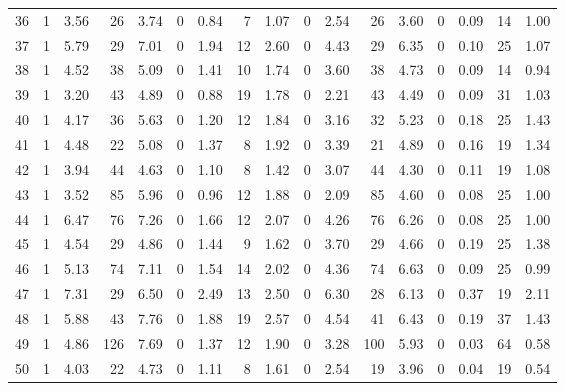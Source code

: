 \begin{table}
\begin{tabular}{lrrrrrrrrrrrrrrrr}
36 & 1 & 3.56 & 26 & 3.74 & 0 & 0.84 & 7 & 1.07 & 0 & 2.54 & 26 & 3.60 & 0 & 0.09 & 14 & 1.00 \\
37 & 1 & 5.79 & 29 & 7.01 & 0 & 1.94 & 12 & 2.60 & 0 & 4.43 & 29 & 6.35 & 0 & 0.10 & 25 & 1.07 \\
38 & 1 & 4.52 & 38 & 5.09 & 0 & 1.41 & 10 & 1.74 & 0 & 3.60 & 38 & 4.73 & 0 & 0.09 & 14 & 0.94 \\
39 & 1 & 3.20 & 43 & 4.89 & 0 & 0.88 & 19 & 1.78 & 0 & 2.21 & 43 & 4.49 & 0 & 0.09 & 31 & 1.03 \\
40 & 1 & 4.17 & 36 & 5.63 & 0 & 1.20 & 12 & 1.84 & 0 & 3.16 & 32 & 5.23 & 0 & 0.18 & 25 & 1.43 \\
41 & 1 & 4.48 & 22 & 5.08 & 0 & 1.37 & 8 & 1.92 & 0 & 3.39 & 21 & 4.89 & 0 & 0.16 & 19 & 1.34 \\
42 & 1 & 3.94 & 44 & 4.63 & 0 & 1.10 & 8 & 1.42 & 0 & 3.07 & 44 & 4.30 & 0 & 0.11 & 19 & 1.08 \\
43 & 1 & 3.52 & 85 & 5.96 & 0 & 0.96 & 12 & 1.88 & 0 & 2.09 & 85 & 4.60 & 0 & 0.08 & 25 & 1.00 \\
44 & 1 & 6.47 & 76 & 7.26 & 0 & 1.66 & 12 & 2.07 & 0 & 4.26 & 76 & 6.26 & 0 & 0.08 & 25 & 1.00 \\
45 & 1 & 4.54 & 29 & 4.86 & 0 & 1.44 & 9 & 1.62 & 0 & 3.70 & 29 & 4.66 & 0 & 0.19 & 25 & 1.38 \\
46 & 1 & 5.13 & 74 & 7.11 & 0 & 1.54 & 14 & 2.02 & 0 & 4.36 & 74 & 6.63 & 0 & 0.09 & 25 & 0.99 \\
47 & 1 & 7.31 & 29 & 6.50 & 0 & 2.49 & 13 & 2.50 & 0 & 6.30 & 28 & 6.13 & 0 & 0.37 & 19 & 2.11 \\
48 & 1 & 5.88 & 43 & 7.76 & 0 & 1.88 & 19 & 2.57 & 0 & 4.54 & 41 & 6.43 & 0 & 0.19 & 37 & 1.43 \\
49 & 1 & 4.86 & 126 & 7.69 & 0 & 1.37 & 12 & 1.90 & 0 & 3.28 & 100 & 5.93 & 0 & 0.03 & 64 & 0.58 \\
50 & 1 & 4.03 & 22 & 4.73 & 0 & 1.11 & 8 & 1.61 & 0 & 2.54 & 19 & 3.96 & 0 & 0.04 & 19 & 0.54 \\
\bottomrule
\end{tabular}
\end{table}
